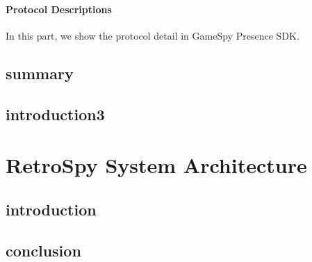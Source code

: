 \documentclass[oneside,titlepage,a4paper]{report} %
\begin{document}
\subsection{Protocol Descriptions}

In this part, we show the protocol detail in GameSpy Presence SDK.

\chapter{summary}

\chapter{introduction3}

\part{RetroSpy System Architecture}

\chapter{introduction}

\chapter{conclusion}
\end{document}
